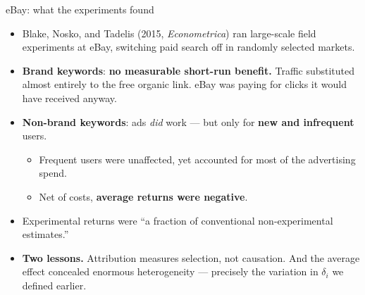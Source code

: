 \documentclass[
  11pt,
  ignorenonframetext,
  aspectratio=169,
]{beamer}
\providecommand{\tightlist}{%
  \setlength{\itemsep}{0pt}\setlength{\parskip}{0pt}}
\begin{document}
\begin{frame}{eBay: what the experiments found}
\protect{}\label{ebay-what-the-experiments-found}
\begin{itemize}
\tightlist
\item
  Blake, Nosko, and Tadelis (2015, \emph{Econometrica}) ran large-scale
  field experiments at eBay, switching paid search off in randomly
  selected markets.
\item
  \textbf{Brand keywords}: \textbf{no measurable short-run benefit.}
  Traffic substituted almost entirely to the free organic link. eBay was
  paying for clicks it would have received anyway.
\item
  \textbf{Non-brand keywords}: ads \emph{did} work --- but only for
  \textbf{new and infrequent} users.

  \begin{itemize}
  \tightlist
  \item
    Frequent users were unaffected, yet accounted for most of the
    advertising spend.
  \item
    Net of costs, \textbf{average returns were negative}.
  \end{itemize}
\item
  Experimental returns were ``a fraction of conventional
  non-experimental estimates.''
\item
  \textbf{Two lessons.} Attribution measures selection, not causation.
  And the average effect concealed enormous heterogeneity --- precisely
  the variation in \(\delta_i\) we defined earlier.
\end{itemize}
\end{frame}
\end{document}

